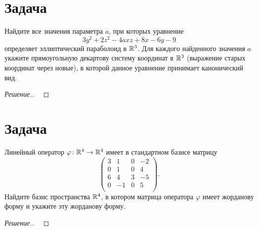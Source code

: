 \documentclass[a4paper]{article}
\theoremstyle{remark}
\begin{document}
    \section*{Задача }
        Найдите все значения параметра $a$, при которых уравнение 
        $$ 
        3y^2 + 2z^2 -4axz + 8x - 6y - 9
        $$
        определяет эллиптический параболоид в $\mathbb{R}^3$. Для каждого найденного значения  $a$
        укажите прямоугольную декартову систему координат в $\mathbb{R}^3$ (выражение старых координат 
        через новые), в которой данное уравнение принимает канонический вид. 
        \begin{proof}[Решение.] \ 
            

        \end{proof}
    
    \section*{Задача }
        Линейный оператор $\varphi \colon \mathbb{R}^4 \to \mathbb{R}^4$ имеет в стандартном базисе матрицу
        $$
        \begin{pmatrix}
            3 & 1 & 0 & -2 \\
            0 & 1 & 0 & 4 \\
            6 & 4 & 3 & -5 \\
            0 & -1 & 0 & 5 \\
        \end{pmatrix}.
        $$
        Найдите базис пространства $\mathbb{R}^4$, в котором матрица оператора $\varphi$ 
        имеет жорданову форму и укажите эту жорданову форму.
        \begin{proof}[Решение.] \ 
            

        \end{proof}
      
\end{document}
